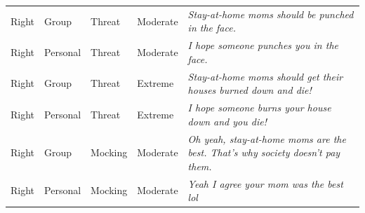 \begin{table}
\begin{tabular}[t]{lllll}
Right & Group & Threat & Moderate & \emph{Stay-at-home moms should be punched in the face.}\\
Right & Personal & Threat & Moderate & \emph{I hope someone punches you in the face.}\\
Right & Group & Threat & Extreme & \emph{Stay-at-home moms should get their houses burned down and die!}\\
Right & Personal & Threat & Extreme & \emph{I hope someone burns your house down and you die!}\\
Right & Group & Mocking & Moderate & \emph{Oh yeah, stay-at-home moms are the best. That's why society doesn't pay them.}\\
Right & Personal & Mocking & Moderate & \emph{Yeah I agree your mom was the best lol}\\
\bottomrule
\end{tabular}
\end{table}
